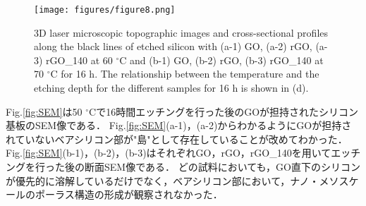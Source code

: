 \documentclass[platex,dvipdfmx]{jlreq}			%
\begin{document}
\begin{figure}[H]
    \centering
    \texttt{[image: figures/figure8.png]}
    \caption{3D laser microscopic topographic images and cross-sectional profiles along the black lines of etched silicon with (a-1) GO, (a-2) rGO, (a-3) rGO\_140 at 60 ${}^\circ$C and (b-1) GO, (b-2) rGO, (b-3) rGO\_140 at 70 ${}^\circ$C for 16 h. The relationship between the temperature and the etching depth for the different samples for 16 h is shown in (d).}
    \label{fig:Etching_temp}
\end{figure}





Fig.\ref{fig:SEM}は50 ${}^\circ$Cで16時間エッチングを行った後のGOが担持されたシリコン基板のSEM像である．
Fig.\ref{fig:SEM}(a-1)，(a-2)からわかるようにGOが担持されていないベアシリコン部が"島"として存在していることが改めてわかった．
Fig.\ref{fig:SEM}(b-1)，(b-2)，(b-3)はそれぞれGO，rGO，rGO\_140を用いてエッチングを行った後の断面SEM像である．
どの試料においても，GO直下のシリコンが優先的に溶解しているだけでなく，ベアシリコン部において，ナノ・メソスケールのポーラス構造の形成が観察されなかった．
\end{document}

